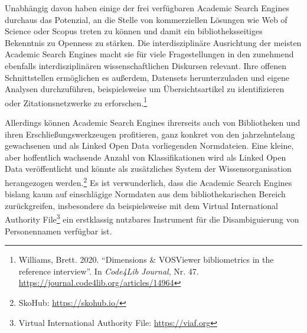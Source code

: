\documentclass[a4paper,
fontsize=11pt,
oneside,
numbers=noperiodatend,
parskip=half-,
bibliography=totoc,
final
]{scrartcl}
\begin{document}
Unabhängig davon haben einige der frei verfügbaren Academic Search
Engines durchaus das Potenzial, an die Stelle von kommerziellen Lösungen
wie Web of Science oder Scopus treten zu können und damit ein
bibliotheksseitiges Bekenntnis zu Openness zu stärken. Die
interdisziplinäre Ausrichtung der meisten Academic Search Engines macht
sie für viele Fragestellungen in den zunehmend ebenfalls
interdisziplinären wissenschaftlichen Diskursen relevant. Ihre offenen
Schnittstellen ermöglichen es außerdem, Datensets herunterzuladen und
eigene Analysen durchzuführen, beispielsweise um Übersichtsartikel zu
identifizieren oder Zitationsnetzwerke zu erforschen.\footnote{Williams,
  Brett. 2020. \enquote{Dimensions \& VOSViewer bibliometrics in the
  reference interview}. In \emph{Code4Lib Journal}, Nr. 47.
  \url{https://journal.code4lib.org/articles/14964}}

Allerdings können Academic Search Engines ihrerseits auch von
Bibliotheken und ihren Erschließungswerkzeugen profitieren, ganz konkret
von den jahrzehntelang gewachsenen und als Linked Open Data vorliegenden
Normdateien. Eine kleine, aber hoffentlich wachsende Anzahl von
Klassifikationen wird als Linked Open Data veröffentlicht und könnte als
zusätzliches System der Wissensorganisation herangezogen
werden.\footnote{SkoHub: \url{https://skohub.io/}} Es ist verwunderlich,
dass die Academic Search Engines bislang kaum auf einschlägige Normdaten
aus dem bibliothekarischen Bereich zurückgreifen, insbesondere da
beispielsweise mit dem Virtual International Authority File\footnote{Virtual
  International Authority File: \url{https://viaf.org}} ein erstklassig
nutzbares Instrument für die Disambiguierung von Personennamen verfügbar
ist.
\end{document}
